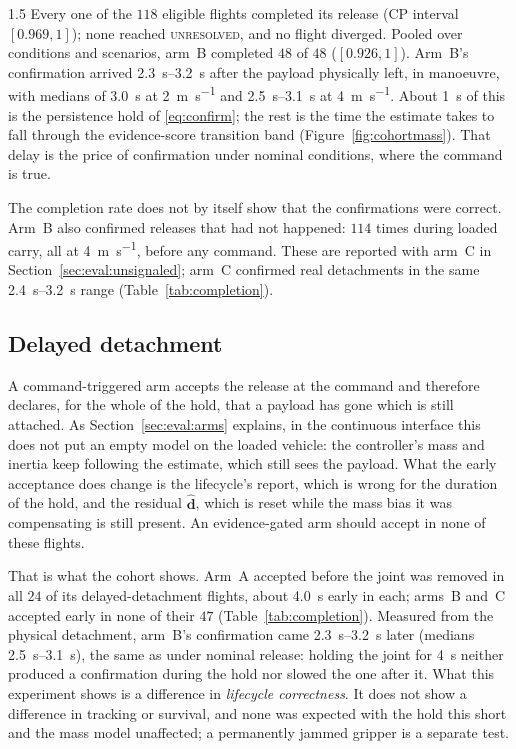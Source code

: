 \begin{spacing}{1.5}
Every one of the $118$ eligible flights completed its release (CP interval
$[0.969, 1]$); none reached \textsc{unresolved}, and no flight diverged. Pooled
over conditions and scenarios, arm~B completed $48$ of $48$
($[0.926, 1]$). Arm~B's confirmation arrived \SIrange{2.3}{3.2}{\second} after
the payload physically left, in manoeuvre, with medians of \SI{3.0}{\second}
at \SI{2}{\meter\per\second} and \SIrange{2.5}{3.1}{\second} at
\SI{4}{\meter\per\second}. About \SI{1}{\second} of this is the persistence
hold of \eqref{eq:confirm}; the rest is the time the estimate takes to fall
through the evidence-score transition band (Figure~\ref{fig:cohortmass}). That delay is the
price of confirmation under nominal conditions, where the command is true.

The completion rate does not by itself show that the confirmations were
correct. Arm~B also confirmed releases that had not happened: $114$ times
during loaded carry, all at \SI{4}{\meter\per\second}, before any command.
These are reported with arm~C in Section~\ref{sec:eval:unsignaled}; arm~C
confirmed real detachments in the same \SIrange{2.4}{3.2}{\second} range
(Table~\ref{tab:completion}).

\subsection{Delayed detachment}\label{sec:eval:delayed}\label{sec:eval:paired}

A command-triggered arm accepts the release at the command and therefore
declares, for the whole of the hold, that a payload has gone which is still
attached. As Section~\ref{sec:eval:arms} explains, in the continuous interface
this does not put an empty model on the loaded vehicle: the controller's mass
and inertia keep following the estimate, which still sees the payload. What the
early acceptance does change is the lifecycle's report, which is wrong for the
duration of the hold, and the residual $\hat{\bm d}$, which is reset while the
mass bias it was compensating is still present. An evidence-gated arm should
accept in none of these flights.

That is what the cohort shows. Arm~A accepted before the joint was removed in
all $24$ of its delayed-detachment flights, about \SI{4.0}{\second} early in
each; arms~B and~C accepted early in none of their $47$
(Table~\ref{tab:completion}). Measured from the physical detachment, arm~B's
confirmation came \SIrange{2.3}{3.2}{\second} later (medians
\SIrange{2.5}{3.1}{\second}), the same as under nominal release: holding the
joint for \SI{4}{\second} neither produced a confirmation during the hold nor
slowed the one after it. What this experiment shows is a difference in
\emph{lifecycle correctness}. It does not show a difference in tracking or
survival, and none was expected with the hold this short and the mass model
unaffected; a permanently jammed gripper is a separate test.


\end{spacing}

